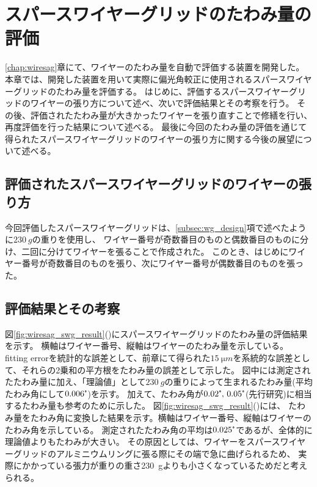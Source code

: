 \documentclass[../../main.tex]{subfiles}
\begin{document}
\chapter{スパースワイヤーグリッドのたわみ量の評価}
\label{chap:wiresag_swg}
\ref{chap:wiresag}章にて、ワイヤーのたわみ量を自動で評価する装置を開発した。
本章では、開発した装置を用いて実際に偏光角較正に使用されるスパースワイヤーグリッドのたわみ量を評価する。
はじめに、評価するスパースワイヤーグリッドのワイヤーの張り方について述べ、次いで評価結果とその考察を行う。
その後、評価されたたわみ量が大きかったワイヤーを張り直すことで修繕を行い、再度評価を行った結果について述べる。
最後に今回のたわみ量の評価を通じて得られたスパースワイヤーグリッドのワイヤーの張り方に関する今後の展望について述べる。

\section{評価されたスパースワイヤーグリッドのワイヤーの張り方}
今回評価したスパースワイヤーグリッドは、\ref{subsec:wg_design}項で述べたように$\SI{230}{g}$の重りを使用し、
ワイヤー番号が奇数番目のものと偶数番目のものに分け、二回に分けてワイヤーを張ることで作成された。
このとき、はじめにワイヤー番号が奇数番目のものを張り、次にワイヤー番号が偶数番目のものを張った。

\section{評価結果とその考察}
図\ref{fig:wiresag_swg_result}()にスパースワイヤーグリッドのたわみ量の評価結果を示す。
横軸はワイヤー番号、縦軸はワイヤーのたわみ量を示している。
fitting errorを統計的な誤差として、前章にて得られた$\SI{15}{\micro m}$を系統的な誤差として、それらの2乗和の平方根をたわみ量の誤差として示した。
図中には測定されたたわみ量に加え、「理論値」として$\SI{230}{g}$の重りによって生まれるたわみ量(平均たわみ角にして$0.006\tcdegree$)を示す。
加えて、たわみ角が$0.02\tcdegree,\,0.05\tcdegree$(先行研究\cite{swg:murata}\cite{swg:iijima})に相当するたわみ量も参考のために示した。
図\ref{fig:wiresag_swg_result}()には、
たわみ量をたわみ角に変換した結果を示す。横軸はワイヤー番号、縦軸はワイヤーのたわみ角を示している。
測定されたたわみ角の平均は$0.025\tcdegree$であるが、全体的に理論値よりもたわみが大きい。
その原因としては、ワイヤーをスパースワイヤーグリッドのアルミニウムリングに張る際にその端で急に曲げられるため、
実際にかかっている張力が重りの重さ\SI{230}{g}よりも小さくなっているためだと考えられる。
\end{document}
